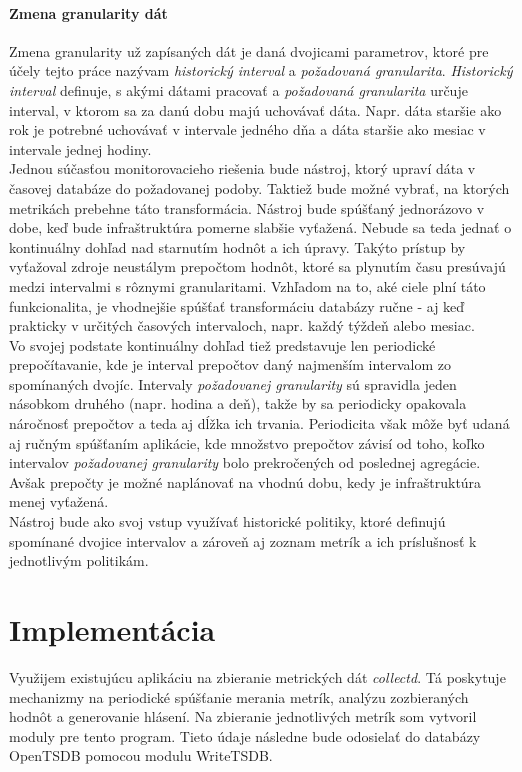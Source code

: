 \documentclass[11pt,final,oneside]{fithesis}
\begin{document}
\subsubsection{Zmena granularity dát}
Zmena granularity už zapísaných dát je daná dvojicami parametrov, ktoré pre účely tejto práce nazývam
\textit{historický interval} a \textit{požadovaná granularita}. \textit{Historický interval} definuje, s akými dátami pracovať a 
\textit{požadovaná granularita} určuje
interval, v ktorom sa za danú dobu majú uchovávať dáta. Napr. dáta staršie ako rok je potrebné uchovávať v intervale jedného dňa a 
dáta staršie ako mesiac v intervale jednej hodiny. 
\\Jednou súčasťou monitorovacieho riešenia bude nástroj, ktorý upraví dáta v časovej databáze do požadovanej podoby.
Taktiež bude možné vybrať,
na ktorých metrikách prebehne táto transformácia. Nástroj bude spúšťaný jednorázovo v dobe, keď bude infraštruktúra pomerne slabšie vyťažená.
Nebude sa teda jednať o kontinuálny dohľad nad starnutím hodnôt a ich úpravy. Takýto prístup by vyťažoval zdroje neustálym prepočtom hodnôt,
ktoré sa plynutím času presúvajú medzi intervalmi s rôznymi granularitami. Vzhľadom na to, aké ciele plní táto funkcionalita,
je vhodnejšie spúšťať transformáciu databázy ručne - aj keď prakticky v určitých časových intervaloch, napr. každý týždeň alebo mesiac.
\\Vo svojej podstate kontinuálny dohľad tiež predstavuje len periodické prepočítavanie, kde je interval prepočtov daný najmenším intervalom zo 
spomínaných dvojíc. Intervaly \textit{požadovanej granularity} sú spravidla jeden násobkom druhého (napr. hodina a deň), takže
by sa periodicky opakovala náročnosť prepočtov a teda aj dĺžka ich trvania. Periodicita však môže byť udaná aj ručným spúšťaním aplikácie, 
kde množstvo prepočtov závisí od toho, koľko intervalov \textit{požadovanej granularity} bolo prekročených od poslednej agregácie.
Avšak prepočty je možné naplánovať na vhodnú dobu, kedy je infraštruktúra menej vyťažená. 
\\Nástroj bude ako svoj vstup využívať historické politiky, ktoré definujú spomínané dvojice intervalov a zároveň aj zoznam metrík
a ich príslušnosť k jednotlivým politikám.

\chapter{Implementácia}
Využijem existujúcu aplikáciu na zbieranie metrických dát \emph{collectd}. Tá poskytuje mechanizmy na periodické spúšťanie merania metrík,
analýzu zozbieraných hodnôt a generovanie hlásení. Na zbieranie jednotlivých metrík som vytvoril moduly pre tento program. Tieto údaje následne bude odosielať do databázy OpenTSDB
pomocou modulu WriteTSDB.
\end{document}

